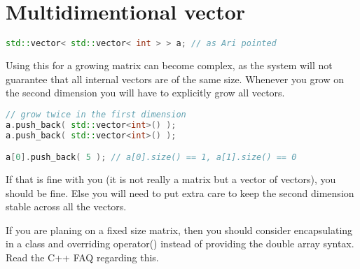 
\chapter{Multidimentional vector}

\begin{lstlisting}[language=C++]
std::vector< std::vector< int > > a; // as Ari pointed
\end{lstlisting}

Using this for a growing matrix can become complex, as the system will not guarantee that all internal vectors are of the same size. Whenever you grow on the second dimension you will have to explicitly grow all vectors.

\begin{lstlisting}[language = C++]
// grow twice in the first dimension
a.push_back( std::vector<int>() );
a.push_back( std::vector<int>() );

a[0].push_back( 5 ); // a[0].size() == 1, a[1].size() == 0
\end{lstlisting}

If that is fine with you (it is not really a matrix but a vector of vectors), you should be fine. Else you will need to put extra care to keep the second dimension stable across all the vectors.

If you are planing on a fixed size matrix, then you should consider encapsulating in a class and overriding operator() instead of providing the double array syntax. Read the C++ FAQ regarding this.
